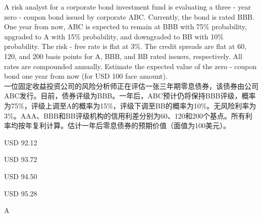 \documentclass{article}
\newcounter{question} %
\begin{document}
\begin{question}
    A risk analyst for a corporate bond investment fund is evaluating a three - year zero - coupon bond issued by corporate ABC. Currently, the bond is rated BBB. One year from now, ABC is expected to remain at BBB with 75\% probability, upgraded to A with 15\% probability, and downgraded to BB with 10\% probability. The risk - free rate is flat at 3\%. The credit spreads are flat at 60, 120, and 200 basis points for A, BBB, and BB rated issuers, respectively. All rates are compounded annually. Estimate the expected value of the zero - coupon bond one year from now (for USD 100 face amount).
    \\一位固定收益投资公司的风险分析师正在评估一张三年期零息债券，该债券由公司ABC发行。目前，债券评级为BBB。一年后，ABC预计仍将保持BBB评级，概率为75\%，评级上调至A的概率为15\%，评级下调至BB的概率为10\%。无风险利率为3\%。AAA、BBB和BB评级机构的信用利差分别为60、120和200个基点。所有利率均按年复利计算。估计一年后零息债券的预期价值（面值为100美元）。
    \end{question}
    
    \begin{choices}
        \item USD 92.12
        \item USD 93.72
        \item USD 94.50
        \item USD 95.28
    \end{choices}
    
    \begin{correctanswer}
        A
    \end{correctanswer}
    
\end{document}
